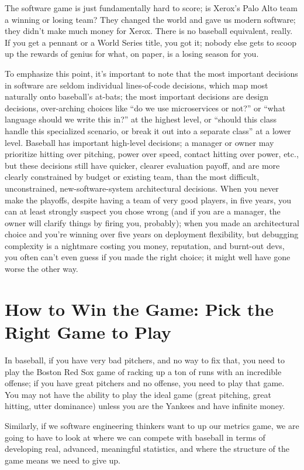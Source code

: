 \documentclass[sigplan,screen]{acmart}
\begin{document}
The software game is just fundamentally hard to score; is Xerox's Palo
Alto team a winning or losing team?  They changed the world and gave
us modern software; they didn't make much money for Xerox.  There is
no baseball equivalent, really.  If you get a pennant or a World
Series title, you got it; nobody else gets to scoop up the rewards
of genius for what, on paper, is a losing season for you.

To emphasize this point, it's important to note that the most
important decisions in software are seldom individual lines-of-code
decisions, which map most naturally onto baseball's at-bats; the most
important decisions are design decisions, over-arching choices like
``do we use microservices or not?'' or ``what language should we write
this in?'' at the highest level, or ``should this class handle this
specialized scenario, or break it out into a separate class'' at a
lower level.  Baseball has important high-level decisions; a manager or
owner may prioritize hitting over pitching, power over speed, contact hitting
over power, etc., but these decisions still have quicker, clearer evaluation payoff, and
are more clearly constrained by budget or existing team, than
the most difficult, unconstrained, new-software-system architectural
decisions.  When you never make the playoffs, despite having a team of
very good players, in
five years, you can at least strongly suspect you chose wrong (and if
you are a manager, the owner will clarify things by firing you, probably); when you made an
architectural choice and you're winning over five years on deployment
flexibility, but debugging complexity is a nightmare costing you
money, reputation,
and burnt-out devs, you often can't
even guess if you made the right choice; it might well have gone worse
the other way.  

\section{How to Win the Game: Pick the Right Game to Play}

In baseball, if you have very bad pitchers, and no way to fix that,
you need to play the Boston Red Sox game of racking up a ton of runs
with an incredible offense; if you have great pitchers and no offense,
you need to play that game.  You may not have the ability to play the
ideal game (great pitching, great hitting, utter dominance) unless you
are the Yankees and have infinite money.

Similarly, if we software engineering thinkers want to up our metrics game, we
are going to have to look at where we can compete with baseball in
terms of developing real, advanced, meaningful statistics, and where
the structure of the game means we need to give up.
\end{document}
